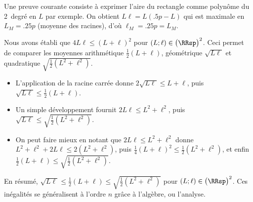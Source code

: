 

\begin{remark}
	Une preuve courante consiste à exprimer l'aire du rectangle comme polynôme du 2\ieme\ degré en $L$ par exemple.
	On obtient $L \ell = L (\num{.5} p - L)$ qui est maximale en $L_M = \num{.25} p$ (moyenne des racines), d'où $\ell_M = \num{.25} p = L_M$.
\end{remark}




\begin{remark} \label{ineq-geo-quad-arith}
	Nous avons établi que
	$4 L \ell \leq (L + \ell)^2$
	pour $(L ; \ell) \in \big( \RRsp \big)^2$.
	Ceci permet de comparer les moyennes arithmétique $\frac12 (L + \ell)$, géométrique $\sqrt{L \ell}$ et quadratique $\sqrt{\frac12 (L^2 + \ell^2)}$.
	\begin{itemize}
		\item L'application de la racine carrée donne
		$2 \sqrt{L \ell} \leq L + \ell$, puis 
		$\sqrt{L \ell} \leq \frac12 (L + \ell)$.
		
		\item Un simple développement fournit $2 L \ell \leq L^2 + \ell^2$, puis
    	$\sqrt{L \ell} \leq \sqrt{\frac12 (L^2 + \ell^2)}$.
		
		\item On peut faire mieux en notant que $2 L \ell \leq L^2 + \ell^2$ donne
		$L^2 + \ell^2 + 2 L \ell \leq 2 (L^2 + \ell^2)$, puis
		$\frac14 (L + \ell)^2 \leq \frac12 (L^2 + \ell^2)$, et enfin 
		$\frac12 (L + \ell) \leq \sqrt{\frac12 (L^2 + \ell^2)}$.
	\end{itemize}
	
	En résumé,
	$\sqrt{L \ell} \leq \frac12 (L + \ell) \leq \sqrt{\frac12 (L^2 + \ell^2)}$
	pour $(L ; \ell) \in \big( \RRsp \big)^2$.
	Ces inégalités se généralisent à l'ordre $n$ grâce à l'algèbre, ou l'analyse.
\end{remark}
